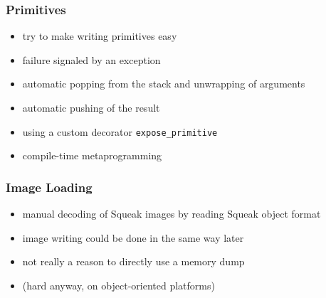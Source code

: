 \documentclass[utf8x]{beamer}
\begin{document}
\begin{frame}
    \frametitle{Primitives}
    \begin{itemize}
    \item try to make writing primitives easy
    \item failure signaled by an exception
    \item automatic popping from the stack and unwrapping of arguments
    \item automatic pushing of the result
    \item using a custom decorator \texttt{expose\_primitive}
    \item compile-time metaprogramming
    \end{itemize}
\end{frame}


\begin{frame}
    \frametitle{Image Loading}
    \begin{itemize}
    \item manual decoding of Squeak images by reading Squeak object format
    \item image writing could be done in the same way later
    \item not really a reason to directly use a memory dump
    \item (hard anyway, on object-oriented platforms)
    \end{itemize}
\end{frame}

\end{document}
